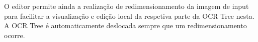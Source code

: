 
O editor permite ainda a realização de redimensionamento da imagem de input para facilitar a visualização e edição local da respetiva parte da OCR Tree nesta. A OCR Tree é automaticamente deslocada sempre que um redimensionamento ocorre.










